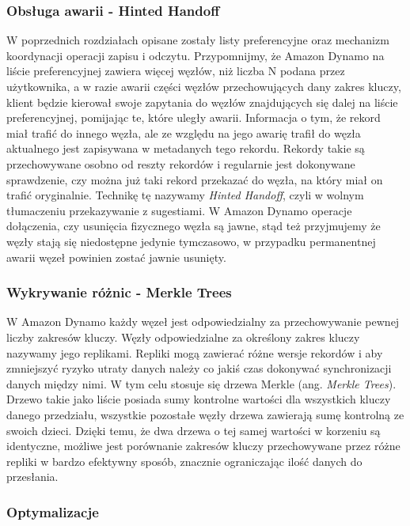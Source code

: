 \subsubsection*{Obsługa awarii - Hinted Handoff}

W poprzednich rozdziałach opisane zostały listy preferencyjne oraz mechanizm koordynacji operacji zapisu i odczytu.
Przypomnijmy, że Amazon Dynamo na liście preferencyjnej zawiera więcej węzłów, niż liczba N podana przez użytkownika, a w razie awarii części węzłów przechowujących dany zakres kluczy, klient będzie kierował swoje zapytania do węzłów znajdujących się dalej na liście preferencyjnej, pomijając te, które uległy awarii.
Informacja o tym, że rekord miał trafić do innego węzła, ale ze względu na jego awarię trafił do węzła aktualnego jest zapisywana w metadanych tego rekordu.
Rekordy takie są przechowywane osobno od reszty rekordów i regularnie jest dokonywane sprawdzenie, czy można już taki rekord przekazać do węzła, na który miał on trafić oryginalnie.
Technikę tę nazywamy \emph{Hinted Handoff}, czyli w wolnym tłumaczeniu przekazywanie z sugestiami.
W Amazon Dynamo operacje dołączenia, czy usunięcia fizycznego węzła są jawne, stąd też przyjmujemy że węzły stają się niedostępne jedynie tymczasowo, w przypadku permanentnej awarii węzeł powinien zostać jawnie usunięty.

\subsubsection*{Wykrywanie różnic - Merkle Trees}
\label{merkle-trees}

W Amazon Dynamo każdy węzeł jest odpowiedzialny za przechowywanie pewnej liczby zakresów kluczy.
Węzły odpowiedzialne za określony zakres kluczy nazywamy jego replikami.
Repliki mogą zawierać różne wersje rekordów i aby zmniejszyć ryzyko utraty danych należy co jakiś czas dokonywać synchronizacji danych między nimi.
W tym celu stosuje się drzewa Merkle (ang. \emph{Merkle Trees}).
Drzewo takie jako liście posiada sumy kontrolne wartości dla wszystkich kluczy danego przedziału, wszystkie pozostałe węzły drzewa zawierają sumę kontrolną ze swoich dzieci.
Dzięki temu, że dwa drzewa o tej samej wartości w korzeniu są identyczne, możliwe jest porównanie zakresów kluczy przechowywane przez różne repliki w bardzo efektywny sposób, znacznie ograniczając ilość danych do przesłania.

\subsubsection*{Optymalizacje}

